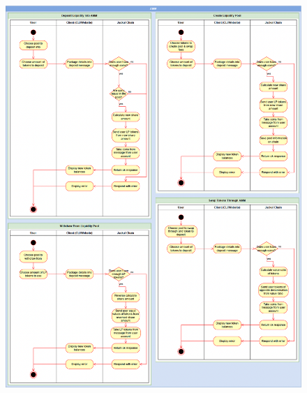 \documentclass[a4paper]{article}
\begin{document}
\begin{figure}[!htbp]
\centering
\includegraphics[width=1\textwidth]{assets/lp1.png}
\caption{}
\end{figure}
\end{document}
